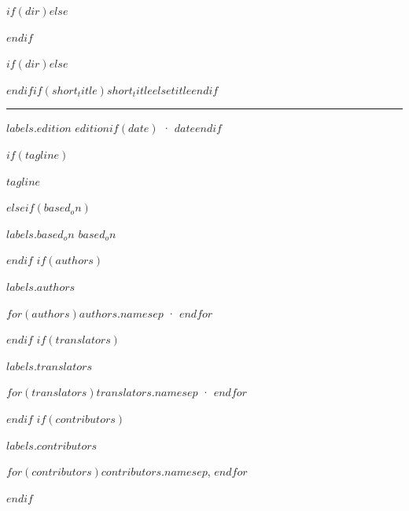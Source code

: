 \begin{titlepage}
  \thispagestyle{empty}
  $if(dir)$\raggedleft\rmfamily$else$\raggedright\sffamily$endif$
  \vspace*{-0.02\textheight}
  \parbox[b][0.47\textheight][b]{0.6\textwidth}{$if(dir)$\raggedleft$else$\raggedright$endif$\fontsize{64}{72}\selectfont\MakeUppercase{$if(short_title)$$short_title$$else$$title$$endif$}\par}\par
  \vspace{1.4cm}
  \textcolor{guideaccent}{\rule{0.36\textwidth}{0.9cm}}\par
  \vspace{1.4cm}
  {\large $labels.edition$ $edition$$if(date)$ · $date$$endif$\par}
  $if(tagline)$
  \vspace{0.3cm}
  {\itshape $tagline$\par}
  $elseif(based_on)$
  \vspace{0.3cm}
  {\itshape $labels.based_on$ $based_on$\par}
  $endif$
  $if(authors)$
  \vspace{1cm}
  {\bfseries $labels.authors$\par}
  $for(authors)$$authors.name$$sep$ · $endfor$\par
  $endif$
  $if(translators)$
  \vspace{0.6cm}
  {\bfseries $labels.translators$\par}
  $for(translators)$$translators.name$$sep$ · $endfor$\par
  $endif$
  $if(contributors)$
  \vspace{0.6cm}
  {\bfseries $labels.contributors$\par}
  {\small $for(contributors)$$contributors.name$$sep$, $endfor$\par}
  $endif$
  \vfill
\end{titlepage}